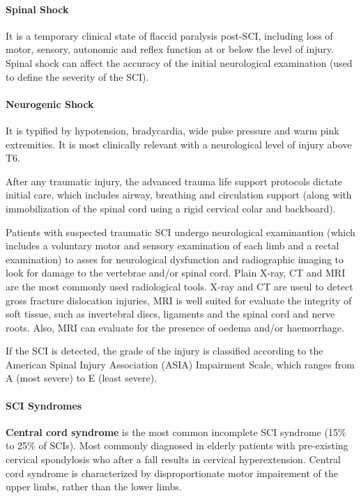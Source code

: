 \documentclass[12pt,article,oneside,a4paper]{memoir}
\begin{document}
\paragraph{Spinal Shock}
It is a temporary clinical state of flaccid paralysis post-SCI, including loss
of motor, sensory, autonomic and reflex function at or below the level of
injury. Spinal shock can affect the accuracy of the initial neurological
examination (used to define the severity of the SCI).

\paragraph{Neurogenic Shock}
It is typified by hypotension, bradycardia, wide pulse pressure and warm pink
extremities. It is most clinically relevant with a neurological level of injury
above T6.

After any traumatic injury, the advanced trauma life support protocols dictate
initial care, which includes airway, breathing and circulation support (along
with immobilization of the spinal cord using a rigid cervical colar and
backboard).

Patients with suspected traumatic SCI undergo neurological examinantion (which
includes a voluntary motor and sensory examination of each limb and a rectal
examination) to asses for neurological dysfunction and radiographic imaging to
look for damage to the vertebrae and/or spinal cord.
Plain X-ray, CT and MRI are the most commonly used radiological tools. X-ray
and CT are useul to detect gross fracture dislocation injuries, MRI is well
suited for evaluate the integrity of soft tissue, such as invertebral discs,
ligaments and the spinal cord and nerve roots. Also, MRI can evaluate for the
presence of oedema and/or haemorrhage.

If the SCI is detected, the grade of the injury is classified according to the
American Spinal Injury Association (ASIA) Impairment Scale, which ranges from A
(most severe) to E (least severe).

\paragraph{SCI Syndromes}
\textbf{Central cord syndrome} is the most common incomplete SCI syndrome (15\%
to 25\% of SCIs). Most commonly diagnosed in elderly patients with pre-existing
cervical spondylosis who after a fall results in cervical hyperextension.
Central cord syndrome is characterized by disproportionate motor impairement of
the upper limbs, rather than the lower limbs.
\end{document}
